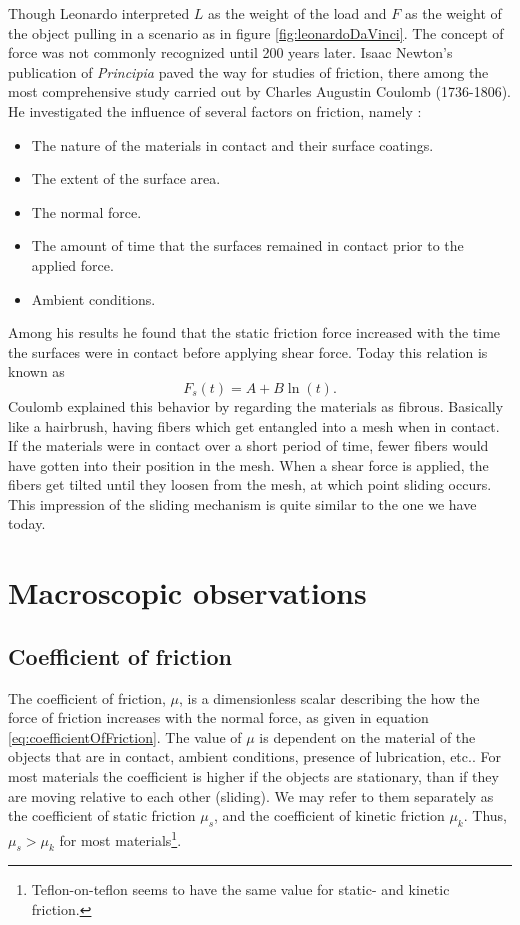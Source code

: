 \documentclass[twoside,english]{uiofysmaster}
\begin{document}
Though Leonardo interpreted $L$ as the weight of the load and $F$ as the weight of the object pulling in a scenario as in figure \ref{fig:leonardoDaVinci}. The concept of force was not commonly recognized until 200 years later. Isaac Newton's publication of \textit{Principia} paved the way for studies of friction, there among the most comprehensive study carried out by Charles Augustin Coulomb (1736-1806). He investigated the influence of several factors on friction, namely \cite{SlidingFriction}:
\begin{itemize}
	\item The nature of the materials in contact and their surface coatings.
	\item The extent of the surface area.
	\item The normal force.
	\item The amount of time that the surfaces remained in contact prior to the applied force.
	\item Ambient conditions.
\end{itemize}   
Among his results he found that the static friction force increased with the time the surfaces were in contact before applying shear force. 
Today this relation is known as
\begin{equation}
F_s(t) = A+B\ln(t).
\end{equation}
Coulomb explained this behavior by regarding the materials as fibrous. 
Basically like a hairbrush, having fibers which get entangled into a mesh when in contact. 
If the materials were in contact over a short period of time, fewer fibers would have gotten into their position in the mesh. 
When a shear force is applied, the fibers get tilted until they loosen from the mesh, at which point sliding occurs. 
This impression of the sliding mechanism is quite similar to the one we have today. 




\section{Macroscopic observations}




\subsection{Coefficient of friction}\label{sec:coefficientOfFriction}
The coefficient of friction, $\mu$, is a dimensionless scalar describing the how the force of friction increases with the normal force, as given in equation \eqref{eq:coefficientOfFriction}.
The value of $\mu$ is dependent on the material of the objects that are in contact, ambient conditions, presence of lubrication, etc.. 
For most materials the coefficient is higher if the objects are stationary, than if they are moving relative to each other (sliding).
We may refer to them separately as the coefficient of static friction $\mu_s$, and the coefficient of kinetic friction $\mu_k$.
Thus, $\mu_s>\mu_ k$ for most materials\footnote{Teflon-on-teflon seems to have the same value for static- and kinetic friction.}.
\end{document}

